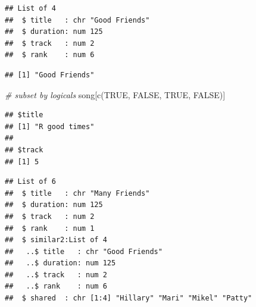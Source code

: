 \documentclass[
]{book}
\newenvironment{Shaded}{\begin{snugshade}}{\end{snugshade}}
\newcommand{\CommentTok}[1]{\textcolor[rgb]{0.56,0.35,0.01}{\textit{#1}}}
\newcommand{\ConstantTok}[1]{\textcolor[rgb]{0.00,0.00,0.00}{#1}}
\newcommand{\FunctionTok}[1]{\textcolor[rgb]{0.00,0.00,0.00}{#1}}
\newcommand{\NormalTok}[1]{#1}
\newcommand{\OtherTok}[1]{\textcolor[rgb]{0.56,0.35,0.01}{#1}}
\newcommand{\SpecialCharTok}[1]{\textcolor[rgb]{0.00,0.00,0.00}{#1}}
\newcommand{\StringTok}[1]{\textcolor[rgb]{0.31,0.60,0.02}{#1}}
\begin{document}
\begin{verbatim}
## List of 4
##  $ title   : chr "Good Friends"
##  $ duration: num 125
##  $ track   : num 2
##  $ rank    : num 6
\end{verbatim}

\begin{Shaded}
\end{Shaded}

\begin{verbatim}
## [1] "Good Friends"
\end{verbatim}

\begin{Shaded}
\begin{Highlighting}[]
\CommentTok{\# subset by logicals}
\NormalTok{song[}\FunctionTok{c}\NormalTok{(}\ConstantTok{TRUE}\NormalTok{, }\ConstantTok{FALSE}\NormalTok{, }\ConstantTok{TRUE}\NormalTok{, }\ConstantTok{FALSE}\NormalTok{)]}
\end{Highlighting}
\end{Shaded}

\begin{verbatim}
## $title
## [1] "R good times"
## 
## $track
## [1] 5
\end{verbatim}

\begin{Shaded}
\end{Shaded}

\begin{verbatim}
## List of 6
##  $ title   : chr "Many Friends"
##  $ duration: num 125
##  $ track   : num 2
##  $ rank    : num 1
##  $ similar2:List of 4
##   ..$ title   : chr "Good Friends"
##   ..$ duration: num 125
##   ..$ track   : num 2
##   ..$ rank    : num 6
##  $ shared  : chr [1:4] "Hillary" "Mari" "Mikel" "Patty"
\end{verbatim}
\end{document}
